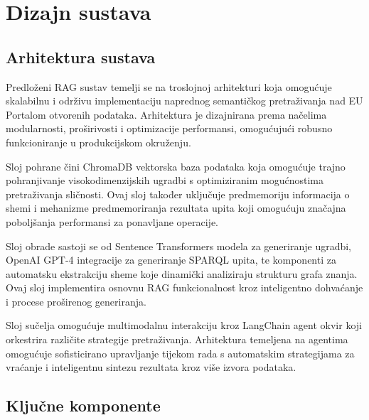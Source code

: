 \chapter{Dizajn sustava}
\label{ch:system_design}


\section{Arhitektura sustava}
\label{sec:architecture}

Predloženi RAG sustav temelji se na troslojnoj arhitekturi koja omogućuje skalabilnu i održivu implementaciju naprednog semantičkog pretraživanja nad EU Portalom otvorenih podataka. Arhitektura je dizajnirana prema načelima modularnosti, proširivosti i optimizacije performansi, omogućujući robusno funkcioniranje u produkcijskom okruženju.

Sloj pohrane čini ChromaDB vektorska baza podataka koja omogućuje trajno pohranjivanje visokodimenzijskih ugradbi s optimiziranim mogućnostima pretraživanja sličnosti. Ovaj sloj također uključuje predmemoriju informacija o shemi i mehanizme predmemoriranja rezultata upita koji omogućuju značajna poboljšanja performansi za ponavljane operacije.

Sloj obrade sastoji se od Sentence Transformers modela za generiranje ugradbi, OpenAI GPT-4 integracije za generiranje SPARQL upita, te komponenti za automatsku ekstrakciju sheme koje dinamički analiziraju strukturu grafa znanja. Ovaj sloj implementira osnovnu RAG funkcionalnost kroz inteligentno dohvaćanje i procese proširenog generiranja.

Sloj sučelja omogućuje multimodalnu interakciju kroz LangChain agent okvir koji orkestrira različite strategije pretraživanja. Arhitektura temeljena na agentima omogućuje sofisticirano upravljanje tijekom rada s automatskim strategijama za vraćanje i inteligentnu sintezu rezultata kroz više izvora podataka.

\section{Ključne komponente}
\label{sec:key_components}

